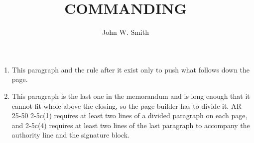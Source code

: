\documentclass{../armymemo}
\author{John W. Smith}\rank{CPT}\branch{CY}
\title{COMMANDING}
\begin{document}
\begin{enumerate}
	\item This paragraph and the rule after it exist only to push what follows down
	      the page.\rule[-4.5in]{0pt}{0pt}
	\item This paragraph is the last one in the memorandum and is long enough that it cannot fit whole above the closing, so the page builder has to divide it. AR 25-50 2-5c(1) requires at least two lines of a divided paragraph on each page, and 2-5c(4) requires at least two lines of the last paragraph to accompany the authority line and the signature block.
\end{enumerate}
\end{document}
